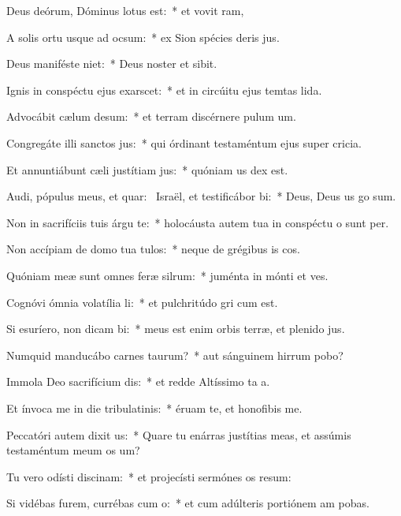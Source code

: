 \item Deus deórum, Dóminus lotus est:~* et vovit ram,
\item A solis ortu usque ad ocsum:~* ex Sion spécies deris jus.
\item Deus maniféste niet:~* Deus noster et  sibit.
\item Ignis in conspéctu ejus exarscet:~* et in circúitu ejus temtas lida.
\item Advocábit cælum desum:~* et terram discérnere pulum um.
\item Congregáte illi sanctos jus:~* qui órdinant testaméntum ejus super cricia.
\item Et annuntiábunt cæli justítiam jus:~* quóniam us dex est.
\item Audi, pópulus meus, et quar:~\pscross{} Israël, et testificábor bi:~* Deus, Deus us go sum.
\item Non in sacrifíciis tuis árgu te:~* holocáusta autem tua in conspéctu o sunt per.
\item Non accípiam de domo tua tulos:~* neque de grégibus is cos.
\item Quóniam meæ sunt omnes feræ silrum:~* juménta in mónti et ves.
\item Cognóvi ómnia volatília li:~* et pulchritúdo gri cum est.
\item Si esuríero, non dicam bi:~* meus est enim orbis terræ, et plenido jus.
\item Numquid manducábo carnes taurum?~* aut sánguinem hirrum pobo?
\item Immola Deo sacrifícium dis:~* et redde Altíssimo ta a.
\item Et ínvoca me in die tribulatinis:~* éruam te, et honofibis me.
\item Peccatóri autem dixit us:~* Quare tu enárras justítias meas, et assúmis testaméntum meum  os um?
\item Tu vero odísti discinam:~* et projecísti sermónes os resum:
\item Si vidébas furem, currébas cum o:~* et cum adúlteris portiónem am pobas.
